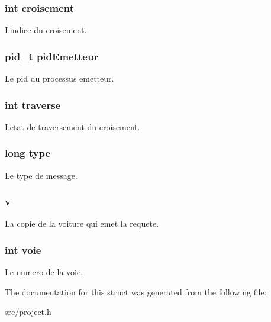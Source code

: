 \subsubsection[{croisement}]{\setlength{\rightskip}{0pt plus 5cm}int croisement}\label{struct_requete_a558796b11448541e07f81ec0df5bf2bc}
L\textquotesingle{}indice du croisement. \hypertarget{struct_requete_a3041e2766c91f9b17975056266bfc841}{}
\subsubsection[{pid\+Emetteur}]{\setlength{\rightskip}{0pt plus 5cm}pid\+\_\+t pid\+Emetteur}\label{struct_requete_a3041e2766c91f9b17975056266bfc841}
Le pid du processus emetteur. \hypertarget{struct_requete_a276684defbdd9a2e8b95ce40b8ef3576}{}
\subsubsection[{traverse}]{\setlength{\rightskip}{0pt plus 5cm}int traverse}\label{struct_requete_a276684defbdd9a2e8b95ce40b8ef3576}
L\textquotesingle{}etat de traversement du croisement. \hypertarget{struct_requete_a6a83a8677f7c78fd146859325e08209a}{}
\subsubsection[{type}]{\setlength{\rightskip}{0pt plus 5cm}long type}\label{struct_requete_a6a83a8677f7c78fd146859325e08209a}
Le type de message. \hypertarget{struct_requete_a76a64000aab59dcc4195c1b6e1605eb3}{}
\subsubsection[{v}]{ v}\label{struct_requete_a76a64000aab59dcc4195c1b6e1605eb3}
La copie de la voiture qui emet la requete. \hypertarget{struct_requete_ad5ecb866a563750cd63db63b9b56c060}{}
\subsubsection[{voie}]{\setlength{\rightskip}{0pt plus 5cm}int voie}\label{struct_requete_ad5ecb866a563750cd63db63b9b56c060}
Le numero de la voie. 

The documentation for this struct was generated from the following file\+:\begin{DoxyCompactItemize}
\item 
src/project.\+h\end{DoxyCompactItemize}
